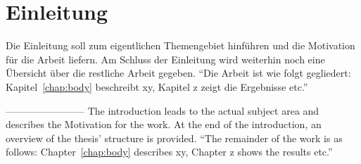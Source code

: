 \chapter{Einleitung}

Die Einleitung soll zum eigentlichen Themengebiet hinführen und die
Motivation für die Arbeit liefern. Am Schluss der Einleitung wird
weiterhin noch eine Übersicht über die restliche Arbeit gegeben.
``Die Arbeit ist wie folgt gegliedert: Kapitel~\ref{chap:body} beschreibt xy, Kapitel z zeigt die Ergebnisse etc.''

------------------------
\newline
The introduction leads to the actual subject area and describes the
Motivation for the work. At the end of the introduction, an overview of the thesis' structure is provided.
``The remainder of the work is as follows: Chapter~\ref{chap:body} describes xy, Chapter z shows the results etc.''
